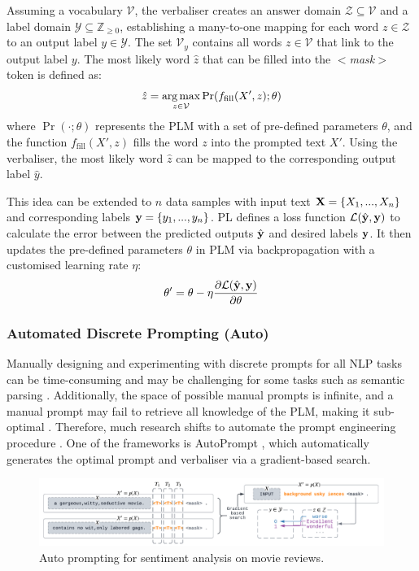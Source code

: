 Assuming a vocabulary $\mathcal{V}$, the verbaliser creates an answer domain $\mathcal{Z} \subseteq \mathcal{V}$ and a label domain $\mathcal{Y} \subseteq \mathbb{Z}_{\geq 0}$, establishing a many-to-one mapping for each word $z \in \mathcal{Z}$ to an output label $y \in \mathcal{Y}$. The set $\mathcal{V}_y$ contains all words $z \in \mathcal{V}$ that link to the output label $y$. The most likely word $\hat{z}$ that can be filled into the $<$\textit{mask}$>$ token is defined as: 
\begin{equation} 
\hat{z} = \operatorname*{arg\,max}_{z\in \mathcal{V}} \Pr(f_{\text{fill}}(X', z);\theta)
\end{equation}
where $\Pr(\cdot; \theta)$ represents the PLM with a set of pre-defined parameters $\theta$, and the function $f_{\text{fill}}(X', z)$ fills the word $z$ into the prompted text $X'$. Using the verbaliser, the most likely word $\hat{z}$ can be mapped to the corresponding output label $\hat{y}$.

This idea can be extended to $n$ data samples with input text $\bold{X} = \{X_1, ..., X_n\}$ and corresponding labels $\bold{y} = \{y_1, ..., y_n\}$. PL defines a loss function $\mathcal{L}(\hat{\bold{y}}, \bold{y})$ to calculate the error between the predicted outputs $\hat{\bold{y}}$ and desired labels $\bold{y}$. It then updates the pre-defined parameters $\theta$ in PLM via backpropagation with a customised learning rate $\eta$:
\begin{equation}
    \theta' = \theta - \eta \frac{\partial \mathcal{L}(\hat{\bold{y}}, \bold{y})}{\partial \theta}
\end{equation}

\subsubsection{Automated Discrete Prompting (Auto)}
Manually designing and experimenting with discrete prompts for all NLP tasks can be time-consuming and may be challenging for some tasks such as semantic parsing \cite{Shin21Auto}. Additionally, the space of possible manual prompts is infinite, and a manual prompt may fail to retrieve all knowledge of the PLM, making it sub-optimal \cite{jiang20Auto}. Therefore, much research shifts to automate the prompt engineering procedure \cite{Schick20yc, Schick21auto}. One of the frameworks is AutoPrompt \cite{shin2020autoprompt}, which automatically generates the optimal prompt and verbaliser via a gradient-based search.

\begin{figure}[!ht]
    \centering
    \includegraphics[width=\hsize]{figures/preparation_media/prepare-auto.pdf}
    \caption{Auto prompting for sentiment analysis on movie reviews.}
    \label{fig:prepare-auto}
\end{figure}

